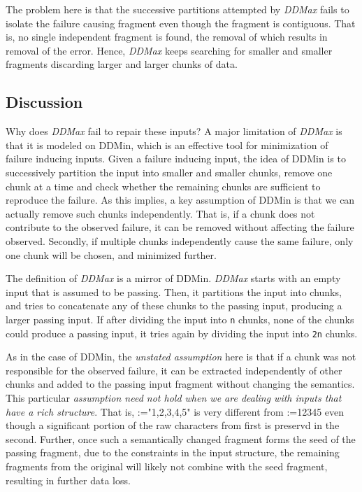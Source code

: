 \documentclass[sigconf,review,anonymous]{acmart}
\makeatletter
\def\<#1>{\texttt{#1}}
\newcommand{\ddmin}{\textit{ddmin}\xspace}
\def\ddmin{DDMin\xspace}
\newcommand{\ddmax}{\textit{DDMax}\xspace}
\newcommand\letterboxed[1]{%
\setlength{\fboxsep}{0pt}%
  \@tfor\@ii:=#1\do{%
    \fcolorbox{white}{light-gray}{\texttt{\strut\@ii}}%
  }%
}
\makeatother
\begin{document}
The problem here is that the successive partitions attempted by \ddmax fails to
isolate the failure causing fragment even though the fragment is contiguous.
That is, no single independent fragment is found, the removal of which results
in removal of the error. Hence, \ddmax keeps searching for smaller and smaller
fragments discarding larger and larger chunks of data.

\subsection{Discussion}
Why does \ddmax fail to repair these inputs? A major limitation of \ddmax is
that it is modeled on \ddmin, which is an effective tool for minimization of
failure inducing inputs. Given a failure inducing input, the idea of \ddmin is
to successively partition the input into smaller and smaller chunks, remove one
chunk at a time and check whether the remaining chunks are sufficient to
reproduce the failure. As this implies, a key assumption of \ddmin is that
we can actually remove such chunks independently. That is, if a chunk does not
contribute to the observed failure, it can be removed without affecting the
failure observed. Secondly, if multiple chunks independently cause
the same failure, only one chunk will be chosen, and minimized further.

The definition of \ddmax is a mirror of \ddmin. \ddmax starts with an empty
input that is assumed to be passing. Then, it partitions the input into chunks,
and tries to concatenate any of these chunks to the passing input, producing a
larger passing input. If after dividing the input into \<n> chunks, none of the
chunks could produce a passing input, it tries again by dividing the
input into \<2n> chunks.

As in the case of \ddmin, the \textit{unstated assumption} here is that if a chunk was
not responsible for the observed failure, it can be extracted independently of
other chunks and added to the passing input fragment without changing the
semantics. This particular \textit{assumption need not hold when we are dealing with
inputs that have a rich structure}. That is, \letterboxed{"1,2,3,4,5"} is very
different from \letterboxed{12345} even though a significant portion of the raw
characters from first is preservd in the second. Further, once such a
semantically changed fragment forms the seed of the passing fragment, due to
the constraints in the input structure, the remaining fragments from the
original will likely not combine with the seed fragment, resulting in further
data loss.
\end{document}
